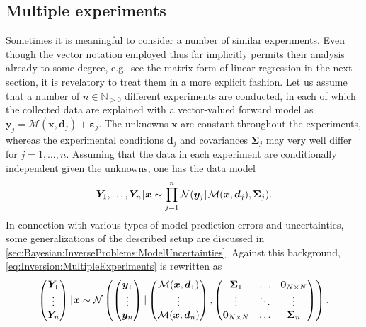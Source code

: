 \subsection{Multiple experiments} \label{sec:Bayesian:InverseProblems:MultipleExperiments}
Sometimes it is meaningful to consider a number of similar experiments.
Even though the vector notation employed thus far implicitly permits their analysis already to some degree,
e.g.\ see the matrix form of linear regression in the next section, it is revelatory to treat them in a more explicit fashion.
Let us assume that a number of \(n \in \mathds{N}_{>0}\) different experiments are conducted,
in each of which the collected data are explained with a vector-valued forward model as \(\bm{y}_j = \mathcal{M}(\bm{x},\bm{d}_j) + \bm{\varepsilon}_j\).
The unknowns \(\bm{x}\) are constant throughout the experiments, whereas the experimental conditions \(\bm{d}_j\)
and covariances \(\bm{\Sigma}_j\) may very well differ for \(j = 1,\ldots,n\).
Assuming that the data in each experiment are conditionally independent given the unknowns, one has the data model
\begin{equation} \label{eq:Inversion:MultipleExperiments}
  \bm{Y}_1,\ldots,\bm{Y}_n {\:\!}|{\:\!} \bm{x} \sim \prod\limits_{j=1}^n \mathcal{N}(\bm{y}_j {\:\!}|{\:\!} \mathcal{M}(\bm{x},\bm{d}_j),\bm{\Sigma}_j).
\end{equation}
In connection with various types of model prediction errors and uncertainties, some generalizations of the described setup are discussed in \cref{sec:Bayesian:InverseProblems:ModelUncertainties}.
Against this background, \cref{eq:Inversion:MultipleExperiments} is rewritten as
\begin{equation} \label{eq:Inversion:MultipleExperiments:Vectorized}
  \begin{pmatrix}
    \bm{Y}_1 \\
    \vdots \\
    \bm{Y}_n \\
  \end{pmatrix}
  {\:\!}|{\:\!} \bm{x}
  \sim \mathcal{N} \left(
  \begin{pmatrix}
    \bm{y}_1 \\
    \vdots \\
    \bm{y}_n \\
  \end{pmatrix}
  {\:\!}|{\:\!}
  \begin{pmatrix}
    \mathcal{M}(\bm{x},\bm{d}_1) \\
    \vdots \\
    \mathcal{M}(\bm{x},\bm{d}_n) \\
  \end{pmatrix},
  \begin{pmatrix}
    \bm{\Sigma}_1 & \ldots & \bm{0}_{N \times N} \\
    \vdots & \ddots & \vdots \\
    \bm{0}_{N \times N} & \ldots & \bm{\Sigma}_n \\
  \end{pmatrix}
  \right).
\end{equation}
